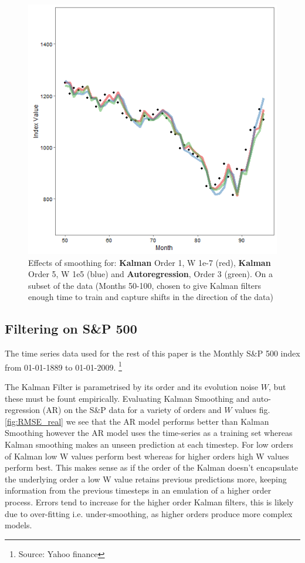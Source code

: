 \documentclass{sig-alternate-05-2015}
\begin{document}
\begin{figure}[ht]
		
				\includegraphics[width=0.7\linewidth]{DifferentModels.png}
	\centering
	\caption{Effects of smoothing for: \textbf{Kalman} Order 1, W 1e-7 (red), \textbf{Kalman} Order 5, W 1e5 (blue) and \textbf{Autoregression}, Order 3 (green). On a subset of the data (Months 50-100, chosen to give Kalman filters enough time to train and capture shifts in the direction of the data)}
			\label{fig:DifferentModels}
\end{figure}

\subsection{Filtering on S\&P 500}
The time series data used for the rest of this paper is the Monthly S\&P 500 index from 01-01-1889 to 01-01-2009. \footnote{Source: Yahoo finance}

The Kalman Filter is parametrised by its order and its evolution noise $W$, but these must be fount empirically. Evaluating Kalman Smoothing and auto-regression (AR) on the S\&P data for a variety of orders and $W$ values fig. \ref{fig:RMSE_real} we see that the AR model performs better than Kalman Smoothing however the AR model uses the time-series as a training set whereas Kalman smoothing makes an unseen prediction at each timestep. 
For low orders of Kalman low W values perform best whereas for higher orders high W values perform best. This makes sense as if the order of the Kalman doesn't encapsulate the underlying order a low W value retains previous predictions more, keeping information from the previous timesteps in an emulation of a higher order process. Errors tend to increase for the higher order Kalman filters, this is likely due to over-fitting i.e. under-smoothing, as higher orders produce more complex models.   
\end{document}
